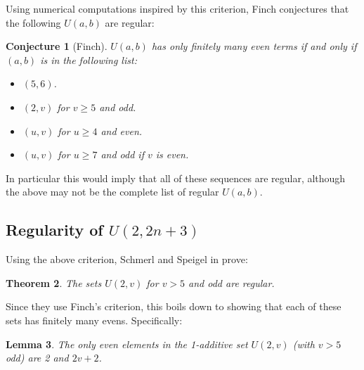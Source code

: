 \documentclass{report}
\newtheorem{theorem}{Theorem}[section]
\newtheorem{lemma}[theorem]{Lemma}
\newtheorem{conjecture}[theorem]{Conjecture}
\theoremstyle{remark}
\numberwithin{equation}{section}
\begin{document}
Using numerical computations inspired by this criterion, Finch
conjectures \cite{finch:em1992} that the following $U(a,b)$ are
regular:

\begin{conjecture}[Finch]
  $U(a,b)$ has only finitely many even terms if and only if $(a,b)$ is
  in the following list:

\begin{itemize}
\item $(5,6)$.
\item $(2,v)$ for $v \geq 5$ and odd.
\item $(u,v)$ for $u \geq 4$ and even.
\item $(u,v)$ for $u \geq 7$ and odd if $v$ is even.
\end{itemize}
\end{conjecture}

In particular this would imply that all of these sequences are
regular, although the above may not be the complete list of regular
$U(a,b)$.

\subsection{Regularity of $U(2,2n+3)$}

Using the above criterion, Schmerl and Speigel in
\cite{schmerl:jct1994} prove:

\begin{theorem}
  The sets $U(2,v)$ for $v > 5$ and odd are regular.
\end{theorem}

Since they use Finch's criterion, this boils down to showing that each
of these sets has finitely many evens.  Specifically: 

\begin{lemma}The only even elements in the 1-additive set $U(2,v)$
  (with $v > 5$ odd) are 2 and $2v+2$.
\end{lemma}
\end{document}
